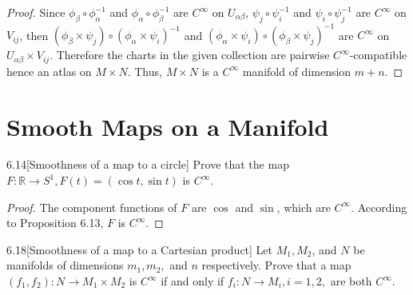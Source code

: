 \begin{proof}
    Since \( \phi_{\beta} \circ \phi_{\alpha}^{-1} \) and \( \phi_{\alpha} \circ \phi_{\beta}^{-1} \) are \( C^{\infty} \) on \( U_{\alpha\beta} \), \( \psi_{j} \circ \psi_{i}^{-1} \) and \( \psi_{i} \circ \psi_{j}^{-1} \) are \( C^{\infty} \) on \( V_{ij} \), then \( {(\phi_{\beta} \times \psi_{j})} \circ {(\phi_{\alpha} \times \psi_{i})}^{-1} \) and \( {(\phi_{\alpha} \times \psi_{i})} \circ {(\phi_{\beta} \times \psi_{j})}^{-1} \) are \( C^{\infty} \) on \( U_{\alpha\beta} \times V_{ij} \). Therefore the charts in the given collection are pairwise \( C^{\infty} \)-compatible hence an atlas on \( M\times N \). Thus, \( M\times N \) is a \( C^{\infty} \) manifold of dimension \( m + n \).
\end{proof}

\section{Smooth Maps on a Manifold}

\begin{exercise}{6.14}[Smoothness of a map to a circle]
    Prove that the map \( F: \mathbb{R} \to S^{1}, F(t) = (\cos t, \sin t) \) is \( C^{\infty} \).
\end{exercise}

\begin{proof}
    The component functions of \( F \) are \( \cos \) and \( \sin \), which are \( C^{\infty} \). According to Proposition 6.13, \( F \) is \( C^{\infty} \).
\end{proof}

\begin{exercise}{6.18}[Smoothness of a map to a Cartesian product]\label{exercise:6.18}
    Let \( M_{1}, M_{2} \), and \( N \) be manifolds of dimensions \( m_{1}, m_{2}, \) and \( n \) respectively. Prove that a map \( (f_{1}, f_{2}): N \to M_{1} \times M_{2} \) is \( C^{\infty} \) if and only if \( f_{i}: N \to M_{i}, i = 1, 2, \) are both \( C^{\infty} \).
\end{exercise}

